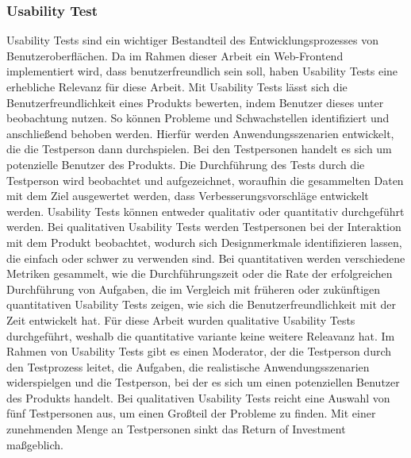 \subsubsection{Usability Test}
Usability Tests sind ein wichtiger Bestandteil des Entwicklungsprozesses von Benutzeroberflächen. Da im Rahmen dieser Arbeit ein Web-Frontend implementiert wird, dass benutzerfreundlich sein soll, haben Usability Tests eine erhebliche Relevanz für diese Arbeit.
Mit Usability Tests lässt sich die Benutzerfreundlichkeit eines Produkts bewerten, indem Benutzer dieses unter beobachtung nutzen. So können Probleme und Schwachstellen identifiziert und anschließend behoben werden. Hierfür werden Anwendungsszenarien entwickelt, die die Testperson dann durchspielen. Bei den Testpersonen handelt es sich um potenzielle Benutzer des Produkts. Die Durchführung des Tests durch die Testperson wird beobachtet und aufgezeichnet, woraufhin die gesammelten Daten mit dem Ziel ausgewertet werden, dass Verbesserungsvorschläge entwickelt werden.\cite[S.~22]{Dumas.1999}
Usability Tests können entweder qualitativ oder quantitativ durchgeführt werden. Bei qualitativen Usability Tests werden Testpersonen bei der Interaktion mit dem Produkt beobachtet, wodurch sich Designmerkmale identifizieren lassen, die einfach oder schwer zu verwenden sind. Bei quantitativen werden verschiedene Metriken gesammelt, wie die Durchführungszeit oder die Rate der erfolgreichen Durchführung von Aufgaben, die im Vergleich mit früheren oder zukünftigen quantitativen Usability Tests zeigen, wie sich die Benutzerfreundlichkeit mit der Zeit entwickelt hat.\cite{Budiu.2017}
Für diese Arbeit wurden qualitative Usability Tests durchgeführt, weshalb die quantitative variante keine weitere Releavanz hat.
Im Rahmen von Usability Tests gibt es einen Moderator, der die Testperson durch den Testprozess leitet, die Aufgaben, die realistische Anwendungsszenarien widerspielgen und die Testperson, bei der es sich um einen potenziellen Benutzer des Produkts handelt.\cite{Moran.2019}
Bei qualitativen Usability Tests reicht eine Auswahl von fünf Testpersonen aus, um einen Großteil der Probleme zu finden. Mit einer zunehmenden Menge an Testpersonen sinkt das Return of Investment maßgeblich.\cite{Nielsen.2012} %